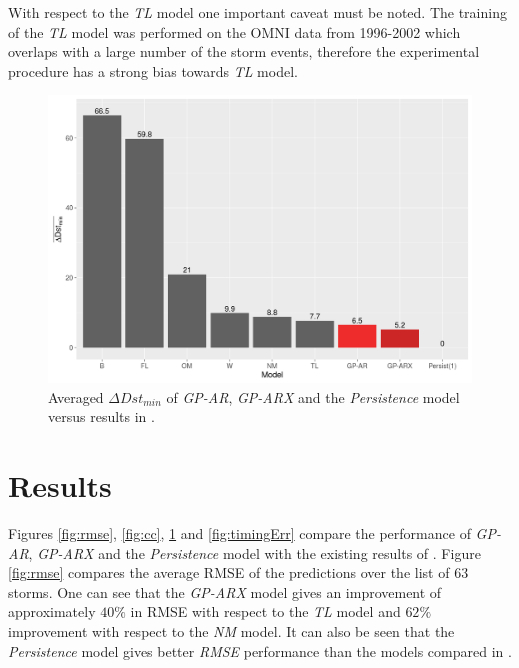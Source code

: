 \documentclass[referee,a4paper,12pt,traditabstract]{swsc}
\begin{document}
\begin{linenumbers}
With respect to the \emph{TL} model one important caveat must be noted. The training of the \emph{TL} model was performed on the OMNI data from 1996-2002 which overlaps with a large number of the storm events, therefore the experimental procedure has a strong bias towards \emph{TL} model.

\begin{figure}
   \centering
   \includegraphics[width=\textwidth]{Compare_deltaDst.png}
      \caption{Averaged $\Delta Dst_{min}$ of \emph{GP-AR}, \emph{GP-ARX} and the \emph{Persistence} model versus results in \citet{Ji2012}.}
         \label{fig:deltaDst}
   \end{figure}

\section{Results} \label{sec:res}

Figures \ref{fig:rmse}, \ref{fig:cc}, \ref{fig:deltaDst} and \ref{fig:timingErr} compare the performance of \emph{GP-AR}, \emph{GP-ARX} and the \emph{Persistence} model with the existing results of \citet{Ji2012}. Figure \ref{fig:rmse} compares the average RMSE of the predictions over the list of 63 storms. One can see that the \emph{GP-ARX} model gives an improvement of approximately $40\%$ in RMSE with respect to the \emph{TL} model and $62\%$ improvement with respect to the \emph{NM} model. It can also be seen that the \emph{Persistence} model gives better \emph{RMSE} performance than the models compared in \citet{Ji2012}.


\end{linenumbers}
\end{document}
